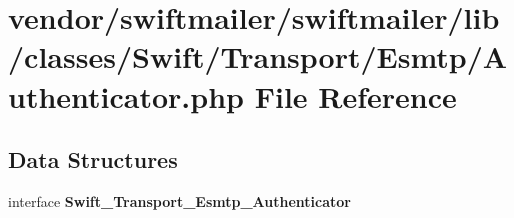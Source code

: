 \section{vendor/swiftmailer/swiftmailer/lib/classes/\+Swift/\+Transport/\+Esmtp/\+Authenticator.php File Reference}
\label{_authenticator_8php}
\subsection*{Data Structures}
\begin{DoxyCompactItemize}
\item 
interface {\bf Swift\+\_\+\+Transport\+\_\+\+Esmtp\+\_\+\+Authenticator}
\end{DoxyCompactItemize}
